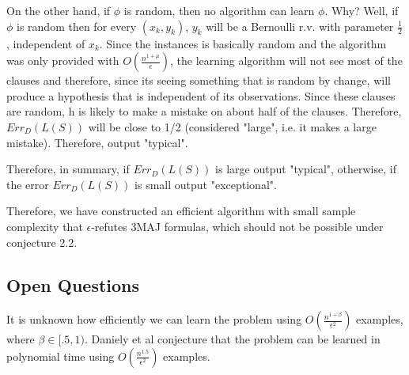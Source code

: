 \documentclass[11pt,a4paper]{article}
\begin{document}
On the other hand, if $\phi$ is random, then no algorithm can learn $\phi$. Why? Well, if $\phi$ is random then for every $(x_k, y_k)$, $y_k$ will be a Bernoulli r.v. with parameter $\frac{1}{2}$, independent of $x_k$. Since the instances is basically random and the algorithm was only provided with $O(\frac{n^{1+\mu}}{\epsilon} )$, the learning algorithm will not see most of the clauses and therefore, since its seeing something that is random by change, will produce a hypothesis that is independent of its observations. Since these clauses are random, h is likely to make a mistake on about half of the clauses. Therefore, $Err_{D}(L(S))$ will be close to 1/2 (considered "large", i.e. it makes a large mistake). Therefore, output "typical".

Therefore, in summary, if $Err_{D}(L(S))$ is large output "typical", otherwise, if the error $Err_{D}(L(S))$ is small output "exceptional".

Therefore, we have constructed an efficient algorithm with small sample complexity that $\epsilon$-refutes 3MAJ formulas, which should not be possible under conjecture 2.2.

\subsection{Open Questions}

It is unknown how efficiently we can learn the problem using $O(\frac{n^{1 + \beta}}{\epsilon^2})$ examples, where $\beta \in [.5, 1)$. Daniely et al conjecture that the problem can be learned in polynomial time using $O(\frac{n^{1.5}}{\epsilon^2})$ examples.
\end{document}
